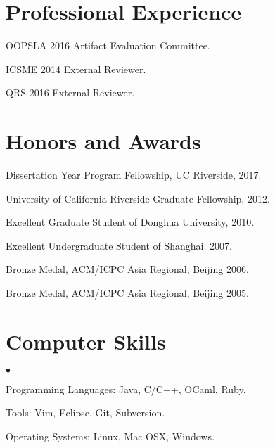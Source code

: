 \documentclass[margin,line]{res}
\newenvironment{list2}{
  \begin{list}{$\bullet$}{%
      \setlength{\itemsep}{0in}
      \setlength{\parsep}{0in} \setlength{\parskip}{0in}
      \setlength{\topsep}{0in} \setlength{\partopsep}{0in} 
      \setlength{\leftmargin}{0.2in}}}{\end{list}}
\begin{document}
\begin{resume}


\section{\sc Professional Experience}

OOPSLA 2016 Artifact Evaluation Committee.

\vspace*{-2.5mm}
ICSME 2014 External Reviewer.

\vspace*{-2.5mm}
QRS 2016 External Reviewer.


\section{\sc Honors and Awards} 
Dissertation Year Program Fellowship, UC Riverside, 2017.

\vspace*{-2.5mm}
University of California Riverside Graduate Fellowship, 2012.

\vspace*{-2.5mm}
Excellent Graduate Student of Donghua University, 2010.

\vspace*{-2.5mm}
Excellent Undergraduate Student of Shanghai. 2007.

\vspace*{-2.5mm}
Bronze Medal, ACM/ICPC Asia Regional, Beijing 2006.

\vspace*{-2.5mm}
Bronze Medal, ACM/ICPC Asia Regional, Beijing 2005.



\section{\sc Computer Skills} 
\begin{list2}
\item Programming Languages: Java, C/C++, OCaml, Ruby.
\item Tools: Vim, Eclipse, Git, Subversion.
\item Operating Systems: Linux, Mac OSX, Windows.
\end{list2}



\end{resume}
\end{document}
